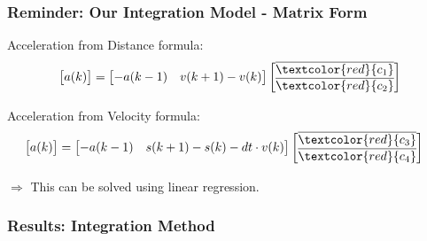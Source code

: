 \begin{frame}
  \frametitle{Reminder: Our Integration Model - Matrix Form}
    Acceleration from Distance formula:
    \begin{align*}
        \begin{bmatrix} a(k) \\ \end{bmatrix}
        &=
        \begin{bmatrix}
            -a(k-1)  & v(k+1) - v(k)   \\ 
        \end{bmatrix}
        \begin{bmatrix}
            \overline{\textcolor{red}{c_1}} \\
            \overline{\textcolor{red}{c_2}} \\
        \end{bmatrix} \\
    \end{align*}

    Acceleration from Velocity formula:
    \begin{align*}
        \begin{bmatrix}
            a(k) \\ 
        \end{bmatrix}
        &=
        \begin{bmatrix}
            -a(k-1) &    s(k+1) - s(k) - dt \cdot  v(k)   \\ 
        \end{bmatrix}
        \begin{bmatrix}
            \overline{\textcolor{red}{c_3}} \\
            \overline{\textcolor{red}{c_4}} \\
        \end{bmatrix}
    \end{align*}

    \hfil

    $\Rightarrow$ This can be solved using linear regression.
\end{frame}

\begin{frame}
  \frametitle{Results: Integration Method}
  \begin{figure}
    \centering
    \begin{minipage}[b]{0.49\linewidth}

    \end{minipage}
    \begin{minipage}[b]{0.49\linewidth}
      \centering
    \end{minipage}
  \end{figure}
\end{frame}

